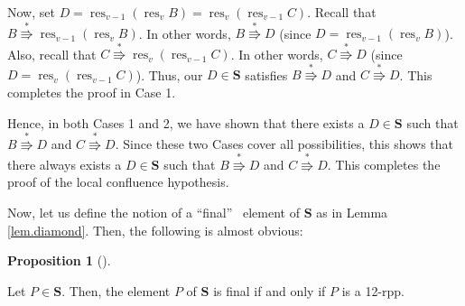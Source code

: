 \documentclass[numbers=enddot,12pt,final,onecolumn,notitlepage]{scrartcl}%
\theoremstyle{definition}
\newtheorem{prop}[theo]{Proposition}
\newenvironment{proposition}[1][]
{\begin{prop}[#1]\begin{leftbar}}
{\end{leftbar}\end{prop}}
\begin{document}
Now, set $D=\operatorname*{res}\nolimits_{v-1}\left(  \operatorname*{res}%
\nolimits_{v}B\right)  =\operatorname*{res}\nolimits_{v}\left(
\operatorname*{res}\nolimits_{v-1}C\right)  $. Recall that $B\overset{\ast
}{\Rrightarrow}\operatorname*{res}\nolimits_{v-1}\left(  \operatorname*{res}%
\nolimits_{v}B\right)  $. In other words, $B\overset{\ast}{\Rrightarrow}D$
(since $D=\operatorname*{res}\nolimits_{v-1}\left(  \operatorname*{res}%
\nolimits_{v}B\right)  $). Also, recall that $C\overset{\ast}{\Rrightarrow
}\operatorname*{res}\nolimits_{v}\left(  \operatorname*{res}\nolimits_{v-1}%
C\right)  $. In other words, $C\overset{\ast}{\Rrightarrow}D$ (since
$D=\operatorname*{res}\nolimits_{v}\left(  \operatorname*{res}\nolimits_{v-1}%
C\right)  $). Thus, our $D\in\mathbf{S}$ satisfies $B\overset{\ast
}{\Rrightarrow}D$ and $C\overset{\ast}{\Rrightarrow}D$. This completes the
proof in Case 1.

Hence, in both Cases 1 and 2, we have shown that there exists a $D\in
\mathbf{S}$ such that $B\overset{\ast}{\Rrightarrow}D$ and $C\overset{\ast
}{\Rrightarrow}D$. Since these two Cases cover all possibilities, this shows
that there always exists a $D\in\mathbf{S}$ such that $B\overset{\ast
}{\Rrightarrow}D$ and $C\overset{\ast}{\Rrightarrow}D$. This completes the
proof of the local confluence hypothesis.

Now, let us define the notion of a \textquotedblleft final\textquotedblright%
\ element of $\mathbf{S}$ as in Lemma \ref{lem.diamond}. Then, the following
is almost obvious:

\begin{proposition}
\label{prop.finality}Let $P\in\mathbf{S}$. Then, the element $P$ of
$\mathbf{S}$ is final if and only if $P$ is a 12-rpp.
\end{proposition}
\end{document}
